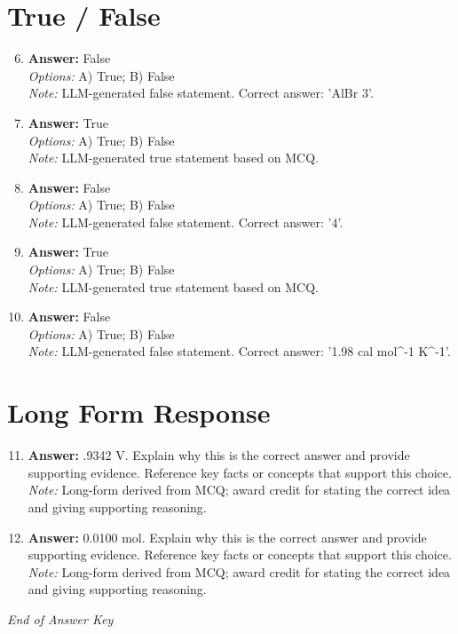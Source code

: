 \documentclass[12pt]{article}
\begin{document}
\section*{True / False}
\begin{enumerate}[label=\arabic*.]
\setcounter{enumi}{5}
\item \textbf{Answer:} False
\\ \textit{Options:} A) True; B) False
\\ \textit{Note:} LLM-generated false statement. Correct answer: 'AlBr 3'.
\item \textbf{Answer:} True
\\ \textit{Options:} A) True; B) False
\\ \textit{Note:} LLM-generated true statement based on MCQ.
\item \textbf{Answer:} False
\\ \textit{Options:} A) True; B) False
\\ \textit{Note:} LLM-generated false statement. Correct answer: '4'.
\item \textbf{Answer:} True
\\ \textit{Options:} A) True; B) False
\\ \textit{Note:} LLM-generated true statement based on MCQ.
\item \textbf{Answer:} False
\\ \textit{Options:} A) True; B) False
\\ \textit{Note:} LLM-generated false statement. Correct answer: '1.98 cal mol^-1 K^-1'.
\end{enumerate}

\section*{Long Form Response}
\begin{enumerate}[label=\arabic*.]
\setcounter{enumi}{10}
\item \textbf{Answer:} .9342 V. Explain why this is the correct answer and provide supporting evidence. Reference key facts or concepts that support this choice.
\\ \textit{Note:} Long-form derived from MCQ; award credit for stating the correct idea and giving supporting reasoning.
\item \textbf{Answer:} 0.0100 mol. Explain why this is the correct answer and provide supporting evidence. Reference key facts or concepts that support this choice.
\\ \textit{Note:} Long-form derived from MCQ; award credit for stating the correct idea and giving supporting reasoning.
\end{enumerate}

\vfill
\noindent\textit{End of Answer Key}
\end{document}
